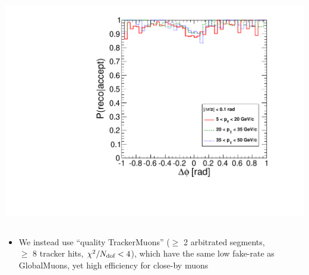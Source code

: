 \documentclass[compress]{beamer}
\newcommand{\s}[1]{{\mbox{\scriptsize #1}}}
\begin{document}
\begin{frame}
\begin{columns}
\includegraphics[width=\linewidth]{efficiency_trackermuons.pdf}
\end{columns}

\begin{itemize}
\item We instead use ``quality TrackerMuons'' {\scriptsize ($\ge$ 2
  arbitrated segments, \\ $\ge$ 8 tracker hits, $\chi^2/N_\s{dof} < 4$)},
  which have the same low fake-rate as GlobalMuons, yet high
  efficiency for close-by muons
\end{itemize}
\end{frame}
\end{document}
